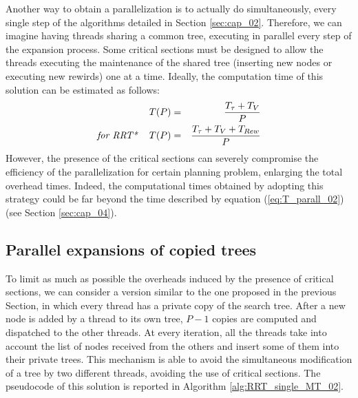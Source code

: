 Another way to obtain a parallelization is to actually do simultaneously, every single step of the algorithms detailed in Section \ref{sec:cap_02}. Therefore, we can imagine having threads sharing a common tree, executing in parallel every step of the expansion process. Some critical sections must be designed to allow the threads executing the maintenance of the shared tree (inserting new nodes or executing new rewirds) one at a time.
Ideally, the computation time of this solution can be estimated as follows:
\begin{eqnarray}
T(P) &=& \frac{T_{\tau} + T_V }{P} \nonumber\\
\textit{for RRT*  \,\,\,\,\,} T(P) &=& \frac{T_{\tau} + T_V + T_{Rew} }{P}
\label{eq:T_parall_02}
\end{eqnarray}
However, the presence of the critical sections can severely compromise the efficiency of the parallelization for certain planning problem, enlarging the total overhead times. Indeed, the computational times obtained by adopting this strategy could be far beyond the time described by equation (\ref{eq:T_parall_02}) (see Section \ref{sec:cap_04}).

\subsection{Parallel expansions of copied trees}
\label{subsec:MT_03}

To limit as much as possible the overheads induced by the presence of critical sections, we can consider a version similar to the one proposed in the previous Section, in which every thread has a private copy of the search tree. After a new node is added by a thread to its own tree, $P-1$ copies are computed and dispatched to the other threads. At every iteration, all the threads take into account the list of nodes received from the others and insert some of them into their private trees. This mechanism is able to avoid the
simultaneous modification of a tree by two different threads, avoiding the use of critical sections. 
The pseudocode of this solution is reported in Algorithm \ref{alg:RRT_single_MT_02}.

